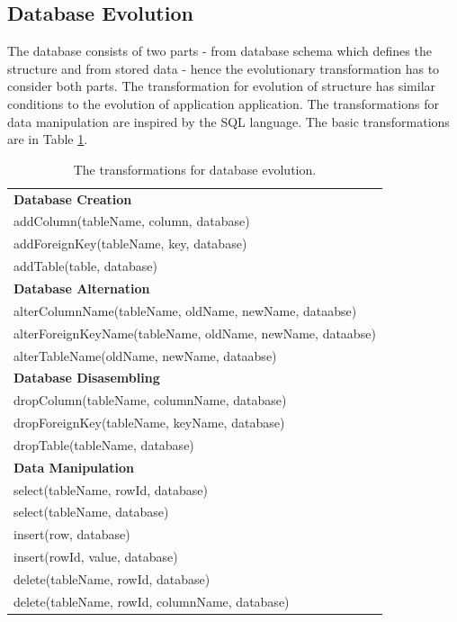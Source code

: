 \documentclass[11pt]{article}
\begin{document}
\subsection{Database Evolution}
\label{sec:db-evolution}
The database consists of two parts - from database schema which defines the structure and from stored data - hence the evolutionary transformation has to consider both parts. The transformation for evolution of structure has similar conditions to the evolution of application application. The transformations for data manipulation are inspired by the SQL language. The basic transformations are in Table \ref{tab:db-basic-evolution}. 
\begin{table}
\centering
	\begin{tabular}{|l|}
	\hline
	\textbf{Database Creation} \\
	addColumn(tableName, column, database) \\
	addForeignKey(tableName, key, database) \\
	addTable(table, database)\\
	\textbf{Database Alternation} \\
	alterColumnName(tableName, oldName, newName, dataabse) \\
	alterForeignKeyName(tableName, oldName, newName, dataabse) \\
	alterTableName(oldName, newName, dataabse) \\
	\textbf{Database Disasembling} \\
	dropColumn(tableName, columnName, database) \\
	dropForeignKey(tableName, keyName, database) \\
	dropTable(tableName, database) \\
	\textbf{Data Manipulation} \\
	select(tableName, rowId, database) \\
	select(tableName, database) \\
	insert(row, database) \\
	insert(rowId, value, database) \\
	delete(tableName, rowId, database) \\
	delete(tableName, rowId, columnName, database) \\
	\hline
	\end{tabular}
	\caption{The transformations for database evolution.}
	\label{tab:db-basic-evolution}
\end{table}
\end{document}
